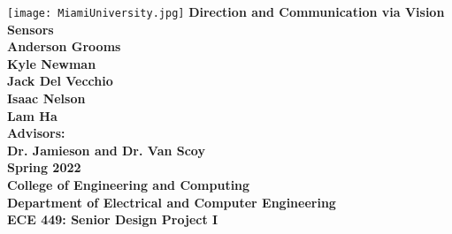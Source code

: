 \documentclass{report}
\begin{document}
\begin{titlepage}
    \centering
    \texttt{[image: MiamiUniversity.jpg]}
    \vskip0.5cm
    {\bfseries\Large
        Direction and Communication via Vision Sensors\\
        \vskip0.5cm
        Anderson Grooms\\
        Kyle Newman\\
        Jack Del Vecchio\\
        Isaac Nelson\\
        Lam Ha\\
        \vskip0.5cm
        Advisors:\\
        Dr. Jamieson and Dr. Van Scoy\\
        \vskip0.5cm
        Spring 2022\\
        College of Engineering and Computing\\
        Department of Electrical and Computer Engineering\\
        ECE 449: Senior Design Project I\\
    }    
    \vfill
    \vfill
\end{titlepage}
\end{document}
